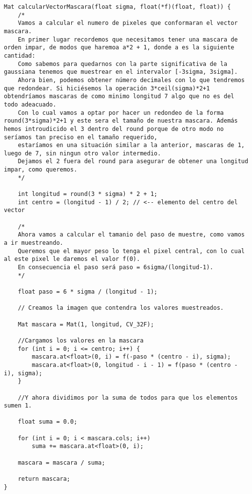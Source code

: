 \documentclass[10pt,a4paper]{article}
\begin{document}
\begin{lstlisting}
Mat calcularVectorMascara(float sigma, float(*f)(float, float)) {
	/*
	Vamos a calcular el numero de pixeles que conformaran el vector mascara.
	En primer lugar recordemos que necesitamos tener una mascara de orden impar, de modos que haremoa a*2 + 1, donde a es la siguiente cantidad:
	Como sabemos para quedarnos con la parte significativa de la gaussiana tenemos que muestrear en el intervalor [-3sigma, 3sigma].
	Ahora bien, podemos obtener número decimales con lo que tendremos que redondear. Si hiciésemos la operación 3*ceil(sigma)*2+1 obtendríamos mascaras de como minimo longitud 7 algo que no es del todo adeacuado.
	Con lo cual vamos a optar por hacer un redondeo de la forma round(3*sigma)*2+1 y este sera el tamaño de nuestra mascara. Además hemos introudicido el 3 dentro del round porque de otro modo no seríamos tan preciso en el tamaño requerido,
	estaríamos en una situación similar a la anterior, mascaras de 1, luego de 7, sin ningun otro valor intermedio.
	Dejamos el 2 fuera del round para asegurar de obtener una longitud impar, como queremos.
	*/

	int longitud = round(3 * sigma) * 2 + 1;
	int centro = (longitud - 1) / 2; // <-- elemento del centro del vector

	/*
	Ahora vamos a calcular el tamanio del paso de muestre, como vamos a ir muestreando.
	Queremos que el mayor peso lo tenga el pixel central, con lo cual al este pixel le daremos el valor f(0).
	En consecuencia el paso será paso = 6sigma/(longitud-1).
	*/

	float paso = 6 * sigma / (longitud - 1);

	// Creamos la imagen que contendra los valores muestreados.

	Mat mascara = Mat(1, longitud, CV_32F);

	//Cargamos los valores en la mascara
	for (int i = 0; i <= centro; i++) {
		mascara.at<float>(0, i) = f(-paso * (centro - i), sigma);
		mascara.at<float>(0, longitud - i - 1) = f(paso * (centro - i), sigma);
	}

	//Y ahora dividimos por la suma de todos para que los elementos sumen 1.

	float suma = 0.0;

	for (int i = 0; i < mascara.cols; i++)
		suma += mascara.at<float>(0, i);

	mascara = mascara / suma;

	return mascara;
}
\end{lstlisting}
\end{document}
